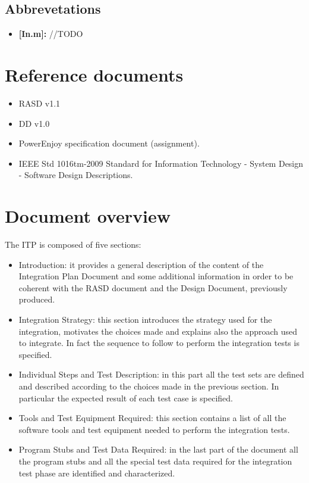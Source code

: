 \subsection{Abbrevetations}

\begin{itemize}
\item \textbf{{[In.m]}:} //TODO
\end{itemize}

\section{Reference documents}

\begin{itemize}
\item RASD v1.1
\item DD v1.0
\item PowerEnjoy specification document (assignment).
\item IEEE Std 1016tm-2009 Standard for Information Technology - System Design - Software Design Descriptions.
\end{itemize}
\section{Document overview}
The ITP is composed of five sections:
\begin{itemize}
\item Introduction: it provides a general description of the content of the Integration Plan Document and some additional information in order to be coherent with the RASD document and the Design Document, previously produced.
\item Integration Strategy: this section introduces the strategy used for the integration, motivates the choices made and explains also the approach used to integrate. In fact the sequence to follow to perform the integration tests is specified.
\item Individual Steps and Test Description: in this part all the test sets are defined and described according to the choices made in the previous section. In particular the expected result of each test case is specified.
\item Tools and Test Equipment Required: this section contains a list of all the software tools and test equipment needed to perform the integration tests.
\item Program Stubs and Test Data Required: in the last part of the document all the program stubs and all the special test data required for the integration test phase are identified and characterized.
\end{itemize}

